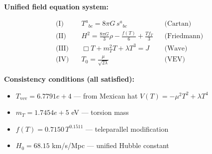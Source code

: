 
\textbf{Unified field equation system:}

\begin{align}
  \text{(I)} \quad & T^a{}_{bc} = 8\pi G \, s^a{}_{bc} && \text{(Cartan)} \\
  \text{(II)} \quad & H^2 = \frac{8\pi G}{3}\rho - \frac{f(T)}{6} + \frac{Tf_T}{3} && \text{(Friedmann)} \\
  \text{(III)} \quad & \Box T + m_T^2 T + \lambda T^3 = J && \text{(Wave)} \\
  \text{(IV)} \quad & T_0 = \frac{\mu}{\sqrt{2\lambda}} && \text{(VEV)}
\end{align}

\textbf{Consistency conditions (all satisfied):}
\begin{itemize}
  \item $T_{\text{vev}} = 6.7791e+4$ — from Mexican hat $V(T) = -\mu^2 T^2 + \lambda T^4$
  \item $m_T = 1.7454e+5$ eV — torsion mass
  \item $f(T) = 0.7150 \, T^{0.1511}$ — teleparallel modification
  \item $H_0 = 68.15$ km/s/Mpc — unified Hubble constant
\end{itemize}